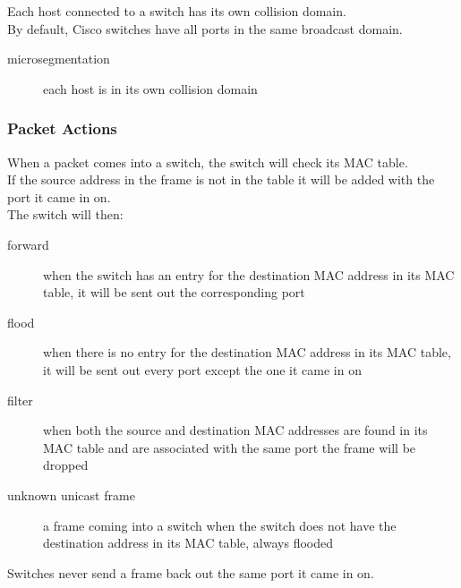 Each host connected to a switch has its own collision domain.\\

By default, Cisco switches have all ports in the same broadcast domain.

\begin{description}

\item[microsegmentation]
each host is in its own collision domain

\end{description}

\subsubsection{Packet Actions}

When a packet comes into a switch, the switch will check its MAC table.\\

If the source address in the frame is not in the table it will be added
with the port it came in on.\\

The switch will then:\\

\begin{description}

\item[forward]
when the switch has an entry for the destination MAC address in its MAC table,
it will be sent out the corresponding port

\item[flood]
when there is no entry for the destination MAC address in its MAC table,
it will be sent out every port except the one it came in on

\item[filter]
when both the source and destination MAC addresses are found in its MAC table
and are associated with the same port the frame will be dropped

\end{description}

\begin{description}

\item[unknown unicast frame]
a frame coming into a switch when the switch does not have the destination
address in its MAC table, always flooded

\end{description}

Switches never send a frame back out the same port it came in on.\\

